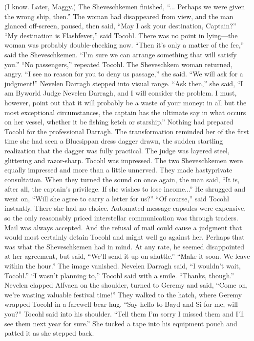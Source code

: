\documentclass[9pt]{article}
\begin{document}
(I know. Later, Maggy.)
The Sheveschkemen finished, “... Perhaps we were given the wrong ship, then.” The woman had
disappeared from view, and the man glanced off-screen, paused, then said, “May I ask your destination,
Captain?”
“My destination is Flashfever,” said Tocohl. There was no point in lying—the woman was probably
double-checking now.
“Then it’s only a matter of the fee,” said the Sheveschkemen. “I’m sure we can arrange something
that will satisfy you.”
“No passengers,” repeated Tocohl.
The Sheveschkem woman returned, angry. “I see no reason for you to deny us passage,” she said.
“We will ask for a judgment!”
Nevelen Darragh stepped into visual range. “Ask then,” she said, “I am Byworld Judge Nevelen
Darragh, and I will consider the problem. I must, however, point out that it will probably be a waste of
your money: in all but the most exceptional circumstances, the captain has the ultimate say in what occurs
on her vessel, whether it be fishing ketch or starship.”
Nothing had prepared Tocohl for the professional Darragh. The transformation reminded her of the
first time she had seen a Bluesippan dress dagger drawn, the sudden startling realization that the dagger
was fully practical. The judge was layered steel, glittering and razor-sharp. Tocohl was impressed.
The two Sheveschkemen were equally impressed and more than a little unnerved. They made hastyprivate consultation. When they turned the sound on once again, the man said, “It is, after all, the
captain’s privilege. If she wishes to lose income...” He shrugged and went on, “Will she agree to carry a
letter for us?”
“Of course,” said Tocohl instantly. There she had no choice. Automated message capsules were
expensive, so the only reasonably priced interstellar communication was through traders. Mail was
always accepted.
And the refusal of mail could cause a judgment that would most certainly detain Tocohl and might
well go against her.
Perhaps that was what the Sheveschkemen had in mind. At any rate, he seemed disappointed at her
agreement, but said, “We’ll send it up on shuttle.”
“Make it soon. We leave within the hour.”
The image vanished.
Nevelen Darragh said, “I wouldn’t wait, Tocohl.”
“I wasn’t planning to,” Tocohl said with a smile. “Thanks, though.”
Nevelen clapped Alfvaen on the shoulder, turned to Geremy and said, “Come on, we’re wasting
valuable festival time!”
They walked to the hatch, where Geremy wrapped Tocohl in a farewell bear hug. “Say hello to Bayd
and Si for me, will you?” Tocohl said into his shoulder. “Tell them I’m sorry I missed them and I’ll see
them next year for sure.” She tucked a tape into his equipment pouch and patted it as she stepped back.
\end{document}
